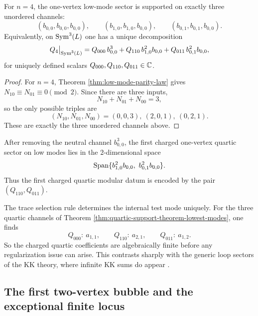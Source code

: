 \begin{theorem}
For $n=4$, the one-vertex low-mode sector is supported on exactly three unordered channels:
\[
(b_{0,0},b_{0,0},b_{0,0}),
\qquad
(b_{1,0},b_{1,0},b_{0,0}),
\qquad
(b_{0,1},b_{0,1},b_{0,0}).
\]
Equivalently, on $\operatorname{Sym}^3(L)$ one has a unique decomposition
\begin{equation}
Q_4\big|_{\operatorname{Sym}^3(L)}
=
Q_{000}\,b_{0,0}^3
+
Q_{110}\,b_{1,0}^2b_{0,0}
+
Q_{011}\,b_{0,1}^2b_{0,0},
\end{equation}
for uniquely defined scalars $Q_{000},Q_{110},Q_{011}\in\mathbb C$.
\end{theorem}

\begin{proof}
For $n=4$, Theorem \ref{thm:low-mode-parity-law} gives
$N_{10}\equiv N_{01}\equiv 0\pmod 2$. Since there are three inputs,
\[
N_{10}+N_{01}+N_{00}=3,
\]
so the only possible triples are
\[
(N_{10},N_{01},N_{00})=(0,0,3),\ (2,0,1),\ (0,2,1).
\]
These are exactly the three unordered channels above.
\end{proof}

\begin{corollary}
After removing the neutral channel $b_{0,0}^3$, the first charged one-vertex quartic sector on
low modes lies in the $2$-dimensional space
\[
\operatorname{Span}\{b_{1,0}^2b_{0,0},\ b_{0,1}^2b_{0,0}\}.
\]
Thus the first charged quartic modular datum is encoded by the pair $(Q_{110},Q_{011})$.
\end{corollary}

\begin{remark}
The trace selection rule determines the internal test mode uniquely. For the three quartic
channels of Theorem \ref{thm:quartic-support-theorem-lowest-modes}, one finds
\[
Q_{000}: \ a_{1,1},
\qquad
Q_{110}: \ a_{2,1},
\qquad
Q_{011}: \ a_{1,2}.
\]
So the charged quartic coefficients are algebraically finite before any regularization issue can
arise. This contrasts sharply with the generic loop sectors of the KK theory,
where infinite KK sums do appear \cite{ZengTwistedHolography}.
\end{remark}

\subsection{The first two-vertex bubble and the exceptional finite locus}

